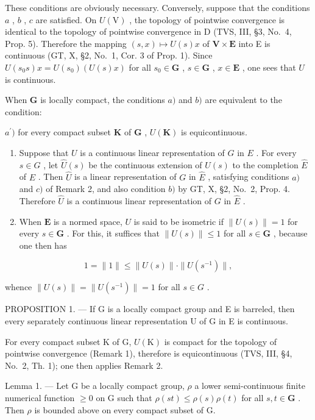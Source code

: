 These conditions are obviously necessary. Conversely, suppose that the conditions \(a\) , \(b\) , \(c\) are satisfied. On \(U(\mathrm{V})\) , the topology of pointwise convergence is identical to the topology of pointwise convergence in D (TVS, III, §3, No.~4, Prop. 5). Therefore the mapping \((s,x)\mapsto U(s)x\) of \(\mathbf{V}\times \mathbf{E}\) into E is continuous (GT, X, §2, No.~1, Cor. 3 of Prop. 1). Since \(U(s_0s)x = U(s_0)(U(s)x)\) for all \(s_0\in \mathbf{G}\) , \(s\in \mathbf{G}\) , \(x\in \mathbf{E}\) , one sees that \(U\) is continuous.

When \(\mathbf{G}\) is locally compact, the conditions \(a)\) and \(b)\) are equivalent to the condition:

\(a^{\prime})\) for every compact subset \(\mathbf{K}\) of \(\mathbf{G}\) , \(U(\mathbf{K})\) is equicontinuous.

\begin{enumerate}
\def\labelenumi{\arabic{enumi})}
\setcounter{enumi}{2}
\item
  Suppose that \(U\) is a continuous linear representation of \(G\) in \(E\) . For every \(s \in G\) , let \(\widehat{U}(s)\) be the continuous extension of \(U(s)\) to the completion \(\widehat{E}\) of \(E\) . Then \(\widehat{U}\) is a linear representation of \(G\) in \(\widehat{E}\) , satisfying conditions \(a)\) and \(c)\) of Remark 2, and also condition \(b)\) by GT, X, §2, No.~2, Prop. 4. Therefore \(\widehat{U}\) is a continuous linear representation of \(G\) in \(\widehat{E}\) .
\item
  When \(\mathbf{E}\) is a normed space, \(U\) is said to be isometric if \(\| U(s)\| = 1\) for every \(s\in \mathbf{G}\) . For this, it suffices that \(\| U(s)\| \leqslant 1\) for all \(s\in \mathbf{G}\) , because one then has
\end{enumerate}

\[
1 = \| 1 \| \leqslant \| U (s) \| \cdot \| U (s ^ {- 1}) \|,
\]

whence \(\| U(s)\| = \| U(s^{-1})\| = 1\) for all \(s\in G\) .

PROPOSITION 1. --- If G is a locally compact group and E is barreled, then every separately continuous linear representation U of G in E is continuous.

For every compact subset K of G, \(U(\mathrm{K})\) is compact for the topology of pointwise convergence (Remark 1), therefore is equicontinuous (TVS, III, §4, No.~2, Th. 1); one then applies Remark 2.

Lemma 1. --- Let G be a locally compact group, \(\rho\) a lower semi-continuous finite numerical function \(\geqslant 0\) on G such that \(\rho(st) \leqslant \rho(s)\rho(t)\) for all \(s, t \in \mathbf{G}\) . Then \(\rho\) is bounded above on every compact subset of G.

